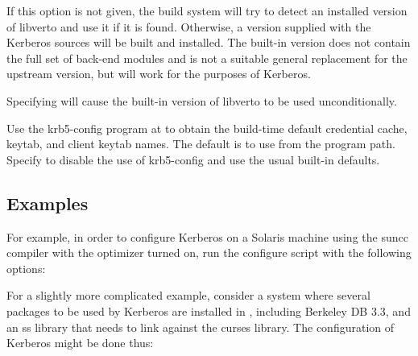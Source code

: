 \documentclass[letterpaper,10pt,english]{sphinxmanual}
\begin{document}
\begin{description}
If this option is not given, the build system will try to detect
an installed version of libverto and use it if it is found.
Otherwise, a version supplied with the Kerberos sources will be
built and installed.  The built-in version does not contain the
full set of back-end modules and is not a suitable general
replacement for the upstream version, but will work for the
purposes of Kerberos.

Specifying \sphinxstylestrong{-} will cause the built-in
version of libverto to be used unconditionally.

\item[{\sphinxstylestrong{-}\sphinxstylestrong{-with-krb5-config=}\sphinxstyleemphasis{PATH}}] \leavevmode
Use the krb5-config program at  to obtain the build-time
default credential cache, keytab, and client keytab names.  The
default is to use  from the program path.  Specify
 to disable the use of krb5-config and
use the usual built-in defaults.

\end{description}


\subsection{Examples}
\label{\detokenize{build/options2configure:examples}}
For example, in order to configure Kerberos on a Solaris machine using
the suncc compiler with the optimizer turned on, run the configure
script with the following options:

%
\begin{sphinxVerbatim}[commandchars=\\\{\}]
   
\end{sphinxVerbatim}

For a slightly more complicated example, consider a system where
several packages to be used by Kerberos are installed in
, including Berkeley DB 3.3, and an ss library that
needs to link against the curses library.  The configuration of
Kerberos might be done thus:
\end{document}
